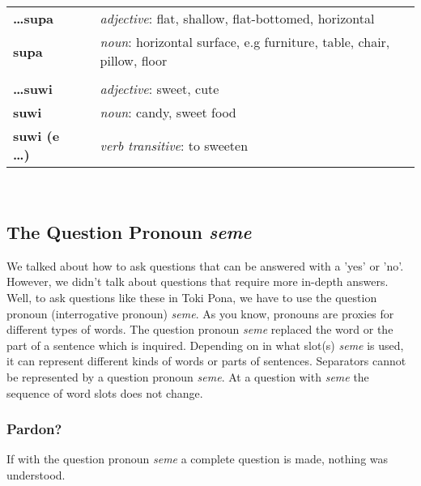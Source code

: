 \begin{supertabular}{p{2,5cm}|ll}
    \textbf{\dots supa}     &  & \textit{adjective}: flat, shallow, flat-bottomed, horizontal                  \\ %
    \textbf{supa}           &  & \textit{noun}: horizontal surface, e.g furniture, table, chair, pillow, floor \\ %
                            &  &                                                                               \\ %
    \textbf{\dots suwi}     &  & \textit{adjective}: sweet, cute                                               \\ %
    \textbf{suwi}           &  & \textit{noun}: candy, sweet food                                              \\ %
    \textbf{suwi (e \dots)} &  & \textit{verb transitive}: to sweeten                                          \\ %
\end{supertabular} \\
%
\newpage
%
\subsection*{The Question Pronoun \textit{seme}}
%
%
We talked about how to ask questions that can be answered with a 'yes' or 'no'.
However, we didn't talk about questions that require more in-depth answers.
Well, to ask questions like these in Toki Pona, we have to use the question pronoun (interrogative pronoun) \textit{seme}.
As you know, pronouns are proxies for different types of words.
The question pronoun \textit{seme} replaced the word or the part of a sentence which is inquired.
Depending on in what slot(s) \textit{seme} is used, it can represent different kinds of words or parts of sentences.
Separators cannot be represented by a question pronoun \textit{seme}.
At a question with \textit{seme} the sequence of word slots does not change.
%
\subsubsection*{Pardon?}
%
%
If with the question pronoun \textit{seme} a complete question is made, nothing was understood.

